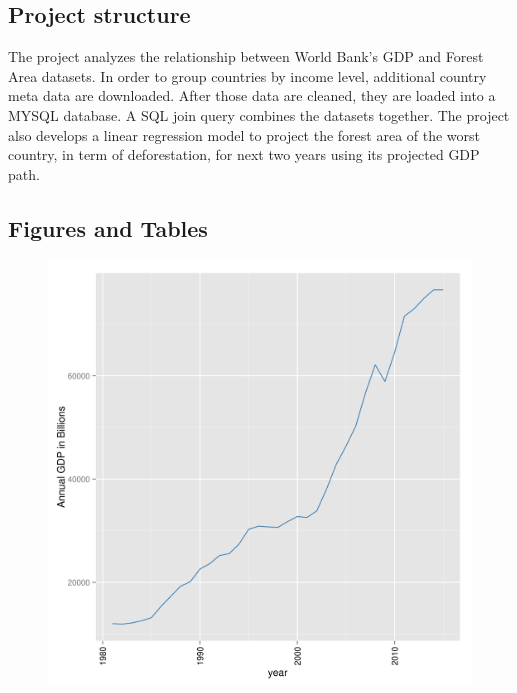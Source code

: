 \documentclass{article}
\begin{document}
\subsection{Project structure}
The project analyzes the relationship between World Bank’s GDP and Forest Area datasets. In order to group countries by income level, additional country meta data are downloaded. After those data are cleaned, they are loaded into a MYSQL database. A SQL join query combines the datasets together. The project also develops a linear regression model to project the forest area of the worst country, in term of deforestation, for next two years using its projected GDP path.
\pagebreak
\subsection{Figures and Tables}
\begin{figure}[h]
\includegraphics[scale=0.8]{gdp_total_by_year.png}
\end{figure}
\pagebreak
\end{document}
